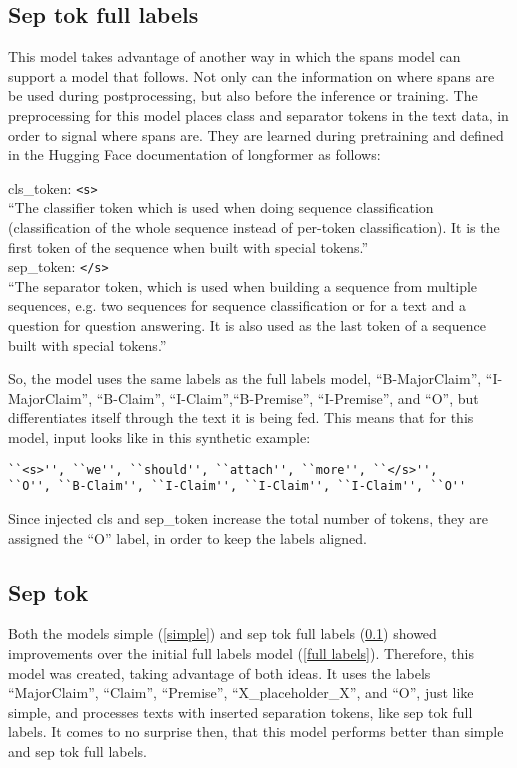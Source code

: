 \documentclass[12]{article}
\theoremstyle{mytheoremstyle}
\theoremstyle{mytheoremstyle}
\theoremstyle{myproblemstyle}
\begin{document}
  \subsection{Sep tok full labels} \label{sep tok full labels}
  This model takes advantage of another way in which the spans model can support a model that follows. 
  Not only can the information on where spans are be used during postprocessing, but also before the inference or training. 
  The preprocessing for this model places class and separator tokens in the text data, in order to signal where spans are. 
  They are learned during pretraining and defined in the Hugging Face documentation of longformer as follows:
  \vspace{1ex}
  \begin{adjustwidth}{0.5cm}{0.5cm}
  cls\_token: \verb|<s>|\\
    ``The classifier token which is used when doing sequence classification (classification of the whole sequence instead of per-token classification). It is the first token of the sequence when built with special tokens.'' \cite{LongformerTokenizer} \vspace{1ex}\\
  sep\_token: \verb|</s>|\\
  ``The separator token, which is used when building a sequence from multiple sequences, e.g. two sequences for sequence classification or for a text and a question for question answering. It is also used as the last token of a sequence built with special tokens.'' \cite{LongformerTokenizer}\vspace{-2ex}\\
  \end{adjustwidth}
  So, the model uses the same labels as the full labels model, ``B-MajorClaim'', ``I-MajorClaim'', ``B-Claim'', ``I-Claim'',``B-Premise'', ``I-Premise'', and ``O'', but differentiates itself through the text it is being fed. This means that for this model, input looks like in this synthetic example:
  \begin{verbatim}
``<s>'', ``we'', ``should'', ``attach'', ``more'', ``</s>'', 
``O'', ``B-Claim'', ``I-Claim'', ``I-Claim'', ``I-Claim'', ``O''
  \end{verbatim}
  \vspace{-3.5ex}
  Since injected cls and sep\_token increase the total number of tokens, they are assigned the ``O'' label, in order to keep the labels aligned.
  \subsection{Sep tok} \label{sep tok}
  Both the models simple (\ref{simple}) and sep tok full labels (\ref{sep tok full labels}) showed improvements over the initial full labels model (\ref{full labels}). 
  Therefore, this model was created, taking advantage of both ideas. 
  It uses the labels ``MajorClaim'', ``Claim'', ``Premise'', ``X\_placeholder\_X'', and ``O'', just like simple, and processes texts with inserted separation tokens, like sep tok full labels. 
  It comes to no surprise then, that this model performs better than simple and sep tok full labels.
\end{document}

